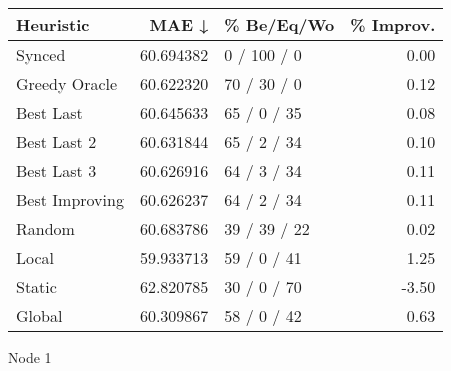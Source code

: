 \begin{tabular}{lrlr}
\toprule
      Heuristic &      MAE ↓ &    \% Be/Eq/Wo & \% Improv. \\
\midrule
         Synced &  60.694382 &   0 / 100 / 0 &      0.00 \\
  Greedy Oracle &  60.622320 &   70 / 30 / 0 &      0.12 \\
      Best Last &  60.645633 &   65 / 0 / 35 &      0.08 \\
    Best Last 2 &  60.631844 &   65 / 2 / 34 &      0.10 \\
    Best Last 3 &  60.626916 &   64 / 3 / 34 &      0.11 \\
 Best Improving &  60.626237 &   64 / 2 / 34 &      0.11 \\
         Random &  60.683786 &  39 / 39 / 22 &      0.02 \\
          Local &  59.933713 &   59 / 0 / 41 &      1.25 \\
         Static &  62.820785 &   30 / 0 / 70 &     -3.50 \\
         Global &  60.309867 &   58 / 0 / 42 &      0.63 \\
\bottomrule
\end{tabular}
\caption{Node 1}
\label{tab:non_lr001_le1_bs2_1}
